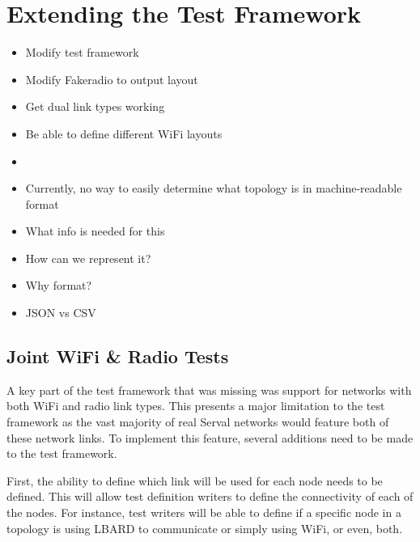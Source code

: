 
\chapter{Extending the Test Framework} %
\label{Chapter4}


\begin{itemize}
    \item Modify test framework
    \item Modify Fakeradio to output layout
    \item Get dual link types working
    \item Be able to define different WiFi layouts
    \item 
\end{itemize}


\begin{itemize}
    \item Currently, no way to easily determine what topology is in machine-readable format
    \item What info is needed for this 
    \item How can we represent it?
    \item Why format?
    \item JSON vs CSV
\end{itemize}


\section{Joint WiFi \& Radio Tests}
A key part of the test framework that was missing was support for networks with both WiFi and radio link types. 
This presents a major limitation  to the test framework as the vast majority of real Serval networks would feature both of these network links.
To implement this feature, several additions need to be made to the test framework.

First, the ability to define which link will be used for each node needs to be defined.
This will allow test definition writers to define the connectivity of each of the nodes. 
For instance, test writers will be able to define if a specific node in a topology is using LBARD to communicate or simply using WiFi, or even, both. 

